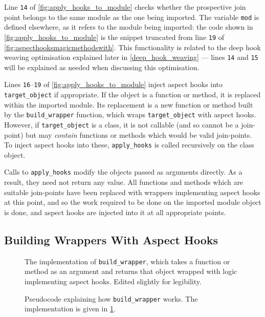 Line \texttt{14} of \cref{fig:apply_hooks_to_module} checks whether the
prospective join point belongs to the same module as the one being imported. The
variable \lstinline{mod} is defined elsewhere, as it refers to the module being
imported: the code shown in \cref{fig:apply_hooks_to_module} is the snippet
truncated from line \texttt{19} of \cref{fig:aspecthooksmagicmethodswith}. This
functionality is related to the deep hook weaving optimisation explained later
in \cref{deep_hook_weaving} --- lines \texttt{14} and \texttt{15} will be
explained as needed when discussing this optimisation.

Lines \texttt{16}--\texttt{19} of \cref{fig:apply_hooks_to_module} inject aspect
hooks into \lstinline{target_object} if appropriate. If the object is a function
or method, it is replaced within the imported module. Its replacement is a
new function or method built by the \lstinline{build_wrapper} function, which wraps
\lstinline{target_object} with aspect hooks. However, if
\lstinline{target_object} is a class, it is not callable (and so cannot be a
join-point) but may \emph{contain} functions or methods which would be valid
join-points. To inject aspect hooks into these, \lstinline{apply_hooks} is
called recursively on the class object.

Calls to \lstinline{apply_hooks} modify the objects passed as arguments
directly. As a result, they need not return any value. All functions
and methods which are suitable join-points have been replaced with wrappers
implementing aspect hooks at this point, and so the work required to be done on
the imported module object is done, and aspect hooks are injected into it at all
appropriate points.


\subsection{Building Wrappers With Aspect Hooks}
\label{building_aspect_Hook_wrappers}

\begin{figure}
    \centering
    
    \caption{The implementation of \lstinline{build_wrapper}, which takes a
    function or method as an argument and returns that object wrapped with logic
    implementing aspect hooks. Edited slightly for legibility.}
    \label{fig:build_wrapper_impl}
\end{figure}

\begin{figure}
    \centering
    
    \caption{Pseudocode explaining how \lstinline{build_wrapper} works. The
    implementation is given in \cref{fig:build_wrapper_impl}.}
    \label{fig:build_wrapper_pseudocode}
\end{figure}



